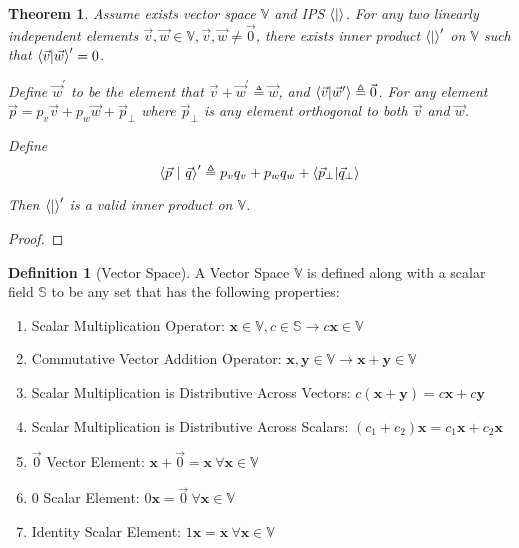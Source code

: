 \documentclass{article}
\newcommand{\B}[1]{\boldsymbol{#1}}
\newtheorem{theorem}{Theorem}[section]
\theoremstyle{definition}
\newtheorem{definition}{Definition}[section]
\theoremstyle{remark}
\begin{document}
\begin{theorem}
  Assume exists vector space $\mathbb{V}$ and IPS $\braket{|}$.
  For any two linearly independent elements $\vec{v}, \vec{w} \in \mathbb{V}, \vec{v}, \vec{w} \neq \vec{0}$, there exists
  inner product $\braket{|}^\prime$ on $\mathbb{V}$ such that $\braket{\vec{v}|\vec{w}}^\prime = 0$.
  
  Define $\vec{w}^\prime$ to be the element that $\vec{v} + \vec{w}^\prime \triangleq \vec{w}$,
  and $\braket{\vec{v}|\vec{w}^\prime} \triangleq \vec{0}$. For any element 
  $\vec{p} = p_v \vec{v} + p_w \vec{w} + \vec{p}_{\perp}$ where $\vec{p}_\perp$ 
  is any element orthogonal to both $\vec{v}$ and $\vec{w}$.

    
  Define 
  \begin{equation}
    \braket{\vec{p}~|~\vec{q}}^\prime \triangleq p_v q_v + p_w q_w + \braket{\vec{p}_{\perp}| \vec{q}_{\perp}}
  \end{equation}

  Then $\braket{|}^\prime$ is a valid inner product on $\mathbb{V}$.

\end{theorem}
\begin{proof}
  
\end{proof}
\begin{definition}[Vector Space]
  A Vector Space $\mathbb{V}$ is defined along with a scalar field $\mathbb{S}$
  to be any set that has the following properties:

  \begin{enumerate}
    \item Scalar Multiplication Operator: $\B{x} \in \mathbb{V}, c \in \mathbb{S} \rightarrow c \B{x} \in \mathbb{V}$
    \item Commutative Vector Addition Operator: $\B{x}, \B{y} \in \mathbb{V} \rightarrow \B{x} + \B{y} \in \mathbb{V}$
    \item Scalar Multiplication is Distributive Across Vectors: $c (\B{x} + \B{y}) = c \B{x} + c \B{y}$
    \item Scalar Multiplication is Distributive Across Scalars: $ (c_1 + c_2) \B{x} = c_1 \B{x} + c_2 \B{x}$
    \item $\vec{0}$ Vector Element: $\B{x} + \vec{0} = \B{x} ~ \forall \B{x} \in \mathbb{V}$
    \item 0 Scalar Element: $0 \B{x} = \vec{0} ~ \forall \B{x} \in \mathbb{V}$
    \item Identity Scalar Element: $1 \B{x} = \B{x} ~ \forall \B{x} \in \mathbb{V}$ 
  \end{enumerate}
  \label{def:vectorSpace}
\end{definition}
\end{document}
